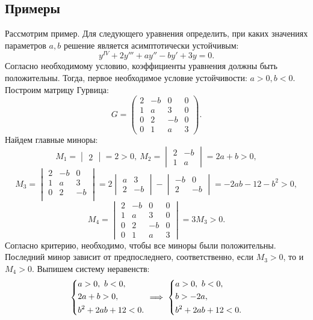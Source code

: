 	\subsection{Примеры}

		Рассмотрим пример. Для следующего уравнения определить, при каких значениях параметров $a, b$ решение является асимптотически устойчивым:
		\[ y^{IV} + 2y''' + a y'' - by' + 3y = 0. \]
		Согласно необходимому условию, коэффициенты уравнения должны быть положительны. Тогда, первое необходимое условие устойчивости: $a > 0, b < 0$. Построим матрицу Гурвица:
		\[ G = \begin{pmatrix}
			2 & -b & 0 & 0 \\
			1 & a & 3 & 0 \\
			0 & 2 & -b & 0 \\
			0 & 1 & a & 3
		\end{pmatrix}. \]
		Найдем главные миноры:
		\[ M_1 = \begin{vmatrix} 2 \end{vmatrix} = 2 > 0, ~ M_2 = \begin{vmatrix} 2 & -b \\ 1 & a \end{vmatrix} = 2a + b > 0, \]
		\[ M_3 = \begin{vmatrix}  
			2 & -b & 0 \\
			1 & a & 3 \\
			0 & 2 & -b \\
		\end{vmatrix} = 2 \begin{vmatrix} a & 3 \\ 2 & -b \end{vmatrix} - \begin{vmatrix} -b & 0 \\ 2 & -b \end{vmatrix} = -2ab - 12 - b^2 > 0, \]
		\[ M_4 = \begin{vmatrix}
			2 & -b & 0 & 0 \\
			1 & a & 3 & 0 \\
			0 & 2 & -b & 0 \\
			0 & 1 & a & 3
		\end{vmatrix} = 3M_3 > 0. \]
		Согласно критерию, необходимо, чтобы все миноры были положительны. Последний минор зависит от предпоследнего, соответственно, если $M_3 > 0$, то и $M_4 > 0$. Выпишем систему неравенств:
		\[ \left\lbrace \begin{aligned} 
			&a > 0, ~ b < 0, \\
			& 2a + b > 0, \\
			&b^2 + 2ab + 12 < 0.
		 \end{aligned} \right. \implies \left\lbrace \begin{aligned} 
			&a > 0, ~ b < 0, \\
			&b > -2a, \\
			&b^2 + 2ab + 12 < 0.
		 \end{aligned} \right. \]
